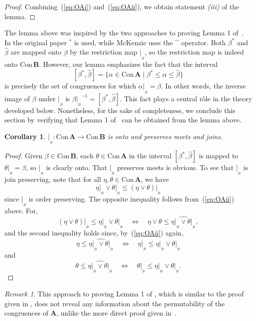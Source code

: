 \documentclass[cm,dissertation]{uhthesis}
\theoremstyle{plain}
\newtheorem{corollary}[theorem]{Corollary}
\theoremstyle{definition}
\theoremstyle{remark}
\newtheorem*{remark}{Remark}
\numberwithin{theorem}{section}
\numberwithin{claim}{chapter}
\numberwithin{equation}{section}
\numberwithin{conjecture}{chapter}
\newcommand{\<}{\ensuremath{\langle}}
\renewcommand{\>}{\ensuremath{\rangle}}
\renewcommand{\leq}{\ensuremath{\leqslant}}
\newcommand{\join}{\ensuremath{\vee}}
\newcommand{\Con}{\ensuremath{\mathrm{Con\,}}}
\newcommand{\0}{\ensuremath{\mathbf{0}}}
\newcommand{\1}{\ensuremath{\mathbf{1}}}
\newcommand{\2}{\ensuremath{\mathbf{2}}}
\newcommand{\3}{\ensuremath{\mathbf{3}}}
\newcommand{\4}{\ensuremath{\mathbf{4}}}
\newcommand{\5}{\ensuremath{\mathbf{5}}}
\newcommand{\bA}{\ensuremath{\mathbf{A}}}
\newcommand{\bB}{\ensuremath{\mathbf{B}}}
\newcommand{\resB}{\ensuremath{|_{_B}}}
\newcommand{\hatmap}{\ensuremath{\widehat{\phantom{x}}}}
\begin{document}
\begin{proof}
  Combining~(\ref{eq:OAi}) and~(\ref{eq:OAii}), we obtain statement {\it (iii)} of the lemma.
\end{proof}

The lemma above was inspired by the two approaches to proving Lemma 1
of~\cite{Palfy:1980}.  In the original paper $^*$ is used, while McKenzie uses
the $\hatmap$ operator.  Both $\beta^*$ and
$\widehat{\beta}$ are mapped onto $\beta$ by the restriction map $\resB$, so
the restriction map is indeed onto $\Con\bB$.
However, our lemma emphasizes the fact that the interval 
\[
  [\beta^*, \widehat{\beta}] = 
  \{
  \alpha \in \Con\bA \mid \beta^* \leq \alpha \leq \widehat{\beta}
  \}
\]
is precisely the set of congruences for
which $\alpha\resB = \beta$.  In other words, the
inverse image of $\beta$ under $\resB$ is
$\beta \resB^{-1} = [\beta^*, \widehat{\beta}]$.
This fact plays a central r\^{o}le in the
theory developed below.
Nonetheless, for the sake of completeness, we conclude this section by
verifying that Lemma 1 of~\cite{Palfy:1980} can be obtained from the lemma above.
\begin{corollary}
  $\resB : \Con\bA \rightarrow \Con\bB$ is onto and preserves meets and joins.
\end{corollary}
\begin{proof}
  Given $\beta\in \Con\bB$, each $\theta\in \Con\bA$ in the interval $[\beta^*,
    \widehat{\beta}]$ is mapped to $\theta\resB = \beta$, so $\resB$ is clearly
  onto.  That $\resB$ preserves meets is obvious.  To see that $\resB$ is
  join preserving, note that for all $\eta, \theta \in \Con\bA$, we have
  \[
  \eta\resB \join \theta\resB \leq (\eta \join \theta)\resB
  \]
  since $\resB$ is order preserving.  The opposite inequality follows
  from~(\ref{eq:OAii}) above. For,
  \[
  (\eta \join \theta)\resB \leq \eta\resB \join \theta\resB
  \quad \Leftrightarrow \quad 
  \eta \join \theta \leq \widehat{\eta\resB \join \theta\resB},
  \]
  and the second inequality holds since, by~(\ref{eq:OAii}) again,
  \[
  \eta \leq \widehat{\eta\resB \join \theta\resB}
  \quad \Leftrightarrow \quad 
  \eta\resB \leq \eta\resB \join \theta\resB
  \]
  and 
  \[
  \theta \leq \widehat{\eta\resB \join \theta\resB}
  \quad \Leftrightarrow \quad 
  \theta\resB \leq \eta\resB \join \theta\resB.
  \]
\end{proof}
\begin{remark}
  This approach to proving Lemma 1 of \cite{Palfy:1980}, which is similar to the
  proof given in \cite{McKenzie:1983}, does not reveal any information about
  the permutability of the congruences of $\bA$, unlike the more direct proof
  given in~\cite{Palfy:1980}. 
\end{remark}
\end{document}
